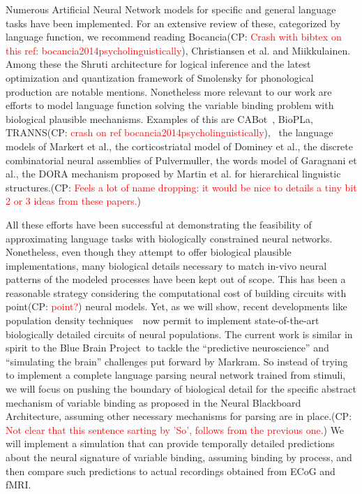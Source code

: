 \documentclass[10pt]{article}
\newcommand{\noteCP}[1]{(CP: \textcolor{red}{#1})}
\begin{document}
Numerous Artificial Neural Network models for specific and general
language tasks have been implemented. For an extensive review of
these, categorized by language function, we recommend reading
Bocancia\noteCP{Crash with bibtex on this ref:
  bocancia2014psycholinguistically}, Christiansen et
al.\cite{Christiansen_1999} and
Miikkulainen\cite{miikkulainen1997natural}. Among these the Shruti
architecture for logical inference\cite{Wendelken_2004} and the latest
optimization and quantization framework of Smolensky for phonological
production\cite{Smolensky_2013} are notable mentions. Nonetheless more
relevant to our work are efforts to model language function solving
the variable binding problem with biological plausible mechanisms.
Examples of this are CABot~\cite{Huyck_2009},
BioPLa\cite{Garcia_Rosa}, TRANNS\noteCP{crash on ref
  {bocancia2014psycholinguistically}}, ~the language models of Markert
et al.\cite{Markert_2007}, the corticostriatal model of Dominey et
al.\cite{Dominey_2009}, the discrete combinatorial neural assemblies
of Pulvermuller\cite{Pulverm_ller_2009,Pulverm_ller_2010}, the words
model of Garagnani et al.\cite{Garagnani_2017}, the DORA mechanism
proposed by Martin et al. for hierarchical linguistic
structures\cite{Martin_2017}.\noteCP{Feels a lot of name dropping: it
  would be nice to details a tiny bit 2 or 3 ideas from these papers.}

All these efforts have been successful at demonstrating the
feasibility of approximating language tasks with biologically
constrained neural networks. Nonetheless, even though they attempt to
offer biological plausible implementations, many biological details
necessary to match in-vivo neural patterns of the modeled processes
have been kept out of scope. This has been a reasonable strategy
considering the computational cost of building circuits with
point\noteCP{point?} neural models. Yet, as we will show, recent
developments like population density
techniques~\cite{de2013generica}~now permit to implement
state-of-the-art biologically detailed circuits of neural populations.
The current work is similar in spirit to the Blue Brain
Project\cite{Markram_2006}~to tackle the ``predictive neuroscience''
and ``simulating the brain'' challenges put forward by
Markram\cite{markram2013seven}. So instead of trying to implement a
complete language parsing neural network trained from stimuli, we will
focus on pushing the boundary of biological detail for the specific
abstract mechanism of variable binding as proposed in the Neural
Blackboard Architecture\cite{van_der_Velde_2006}, assuming other
necessary mechanisms for parsing are in place.\noteCP{Not clear that
  this sentence sarting by 'So', follows from the previous one.} We
will implement a simulation that can provide temporally detailed
predictions about the neural signature of variable binding, assuming
binding by process, and then compare such predictions to actual
recordings obtained from ECoG and fMRI.
\end{document}
